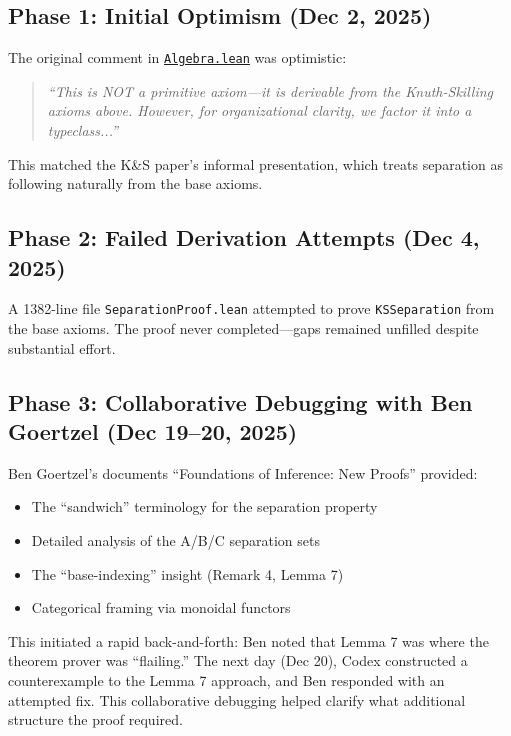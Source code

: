 \documentclass[11pt]{article}
\theoremstyle{definition}
\theoremstyle{remark}
\begin{document}
\subsection*{Phase 1: Initial Optimism (Dec 2, 2025)}

The original comment in \href{https://github.com/zariuq/ks-foundations-of-inference/blob/main/KnuthSkilling/Core/Algebra.lean}{\texttt{Algebra.lean}} was optimistic:

\begin{quote}
\textit{``This is NOT a primitive axiom---it is derivable from the Knuth-Skilling axioms above.
However, for organizational clarity, we factor it into a typeclass...''}
\end{quote}

This matched the K\&S paper's informal presentation, which treats separation as following
naturally from the base axioms.

\subsection*{Phase 2: Failed Derivation Attempts (Dec 4, 2025)}

A 1382-line file \texttt{SeparationProof.lean} attempted to prove \texttt{KSSeparation} from
the base axioms. The proof never completed---gaps remained unfilled despite substantial effort.

\subsection*{Phase 3: Collaborative Debugging with Ben Goertzel (Dec 19--20, 2025)}

Ben Goertzel's documents ``Foundations of Inference: New Proofs'' provided:
\begin{itemize}
\item The ``sandwich'' terminology for the separation property
\item Detailed analysis of the A/B/C separation sets
\item The ``base-indexing'' insight (Remark 4, Lemma 7)
\item Categorical framing via monoidal functors
\end{itemize}

This initiated a rapid back-and-forth: Ben noted that Lemma 7 was where the theorem prover
was ``flailing.'' The next day (Dec 20), Codex constructed a counterexample to the Lemma 7
approach, and Ben responded with an attempted fix. This collaborative debugging helped
clarify what additional structure the proof required.
\end{document}
